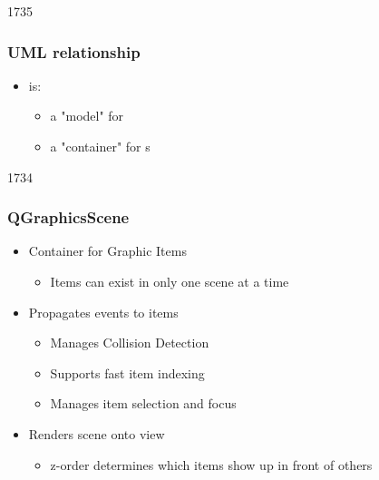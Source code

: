 
\begin{slide}{1735}
\frametitle{UML relationship}
\begin{itemize}

\item {} is:
    \begin{itemize}
    \item a "model" for 
    \item a "container" for s
    \end{itemize}

\end{itemize}


\end{slide}


\begin{slide}{1734}
\frametitle{QGraphicsScene}
\begin{itemize}
\item Container for Graphic Items
    \begin{itemize}
    \item Items can exist in only one scene at a time
    \end{itemize}
\item Propagates events to items
    \begin{itemize}
    \item Manages Collision Detection
    \item Supports fast item indexing
    \item Manages item selection and focus
    \end{itemize}
\item Renders scene onto view
    \begin{itemize}
    \item z-order determines which items show up in front of others
    \end{itemize}
\end{itemize}
\end{slide}

